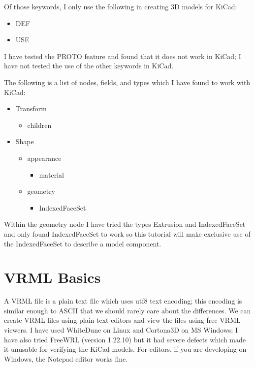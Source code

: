 \documentclass[a4paper, dvipdfm]{article}
\begin{document}
Of those keywords, I only use the following in creating 3D models for KiCad:
\begin{itemize}
\item {DEF}
\item {USE}
\end{itemize}

I have tested the PROTO feature and found that it does not work in KiCad; I have not tested the use of the other keywords in KiCad.

The following is a list of nodes, fields, and types which I have found to work with KiCad:

\begin{itemize}
\item Transform
  \begin{itemize}
    \item children
  \end{itemize}
\item Shape
  \begin{itemize}
    \item appearance
      \begin{itemize}
        \item material
      \end{itemize}
    \item geometry
      \begin{itemize}
        \item IndexedFaceSet
      \end{itemize}
  \end{itemize}
\end{itemize}

Within the geometry node I have tried the types Extrusion and IndexedFaceSet and only found IndexedFaceSet to work so this tutorial will
make exclusive use of the IndexedFaceSet to describe a model component.

\section{VRML Basics}
 A VRML file is a plain text file which uses utf8 text encoding; this encoding is similar enough to ASCII that we should rarely care about the differences.
We can create VRML files using plain text editors and view the files using free VRML viewers. I have used WhiteDune on Linux and Cortona3D on
MS Windows; I have also tried FreeWRL (version 1.22.10) but it had severe defects which made it unusable for verifying the KiCad models.
For editors, if you are developing on Windows, the Notepad editor works fine.
\end{document}
